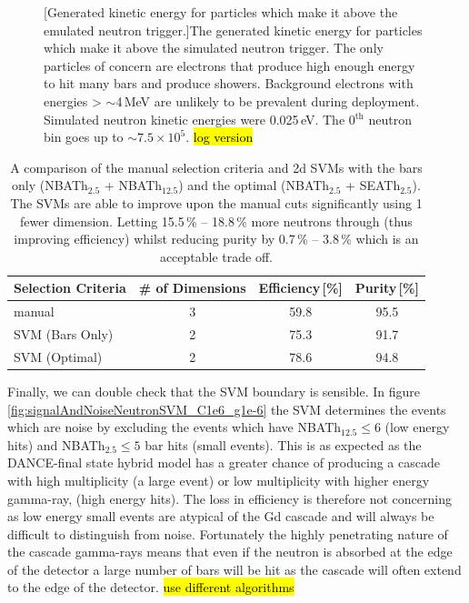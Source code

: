 \begin{figure}[!h]
\begin{minipage}{.45\textwidth}
  [Generated kinetic energy for particles which make it above the emulated neutron trigger.]{The generated kinetic energy for particles which make it above the simulated neutron trigger. The only particles of concern are electrons that produce high enough energy to hit many bars and produce showers. Background electrons with energies > $\sim$4\,MeV are unlikely to be prevalent during deployment. Simulated neutron kinetic energies were 0.025\,eV. The 0$^\textrm{th}$ neutron bin goes up to $\sim 7.5 \times 10^5$. \hl{log version}}
  \label{fig:GeneratedEnergyPastTriggerGdDicebox}
\end{minipage}
\end{figure}

\begin{table}[!h]
\centering
\begin{tabular}{lccc}  
\toprule
Selection Criteria & \# of Dimensions & Efficiency\,[\%] & Purity\,[\%] \\
\midrule
manual            & 3                & 59.8             & 95.5         \\
SVM (Bars Only)    & 2                & 75.3             & 91.7         \\
SVM (Optimal)      & 2                & 78.6             & 94.8         \\
\bottomrule  
\end{tabular}
\caption{A comparison of the manual selection criteria and 2d SVMs with the bars only (NBATh$_{2.5}$ + NBATh$_{12.5}$) and the optimal (NBATh$_{2.5}$ + SEATh$_{2.5}$). The SVMs are able to improve upon the manual cuts significantly using 1 fewer dimension. Letting 15.5\,\% -- 18.8\,\% more neutrons through (thus improving efficiency) whilst reducing purity by 0.7\,\% -- 3.8\,\% which is an acceptable trade off.}
\label{tab:svmSelection}
\end{table}

Finally, we can double check that the SVM boundary is sensible. In figure \ref{fig:signalAndNoiseNeutronSVM_C1e6_g1e-6} the SVM determines the events which are noise by excluding the events which have NBATh$_{12.5}\leq 6$ (low energy hits) and NBATh$_{2.5} \leq 5$ bar hits (small events). This is as expected as the DANCE-final state hybrid model has a greater chance of producing a cascade with high multiplicity (a large event) or low multiplicity with higher energy gamma-ray, (high energy hits). The loss in efficiency is therefore not concerning as low energy small events are atypical of the Gd cascade and will always be difficult to distinguish from noise. Fortunately the highly penetrating nature of the cascade gamma-rays means that even if the neutron is absorbed at the edge of the detector a large number of bars will be hit as the cascade will often extend to the edge of the detector. \hl{use different algorithms}

